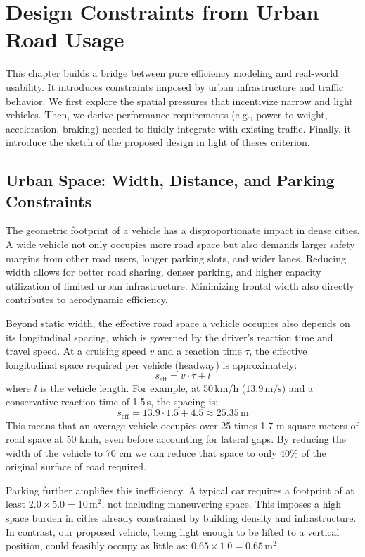 \section{Design Constraints from Urban Road Usage}

This chapter builds a bridge between pure efficiency modeling and real-world usability. It introduces constraints imposed by urban infrastructure and traffic behavior. We first explore the spatial pressures that incentivize narrow and light vehicles. Then, we derive performance requirements (e.g., power-to-weight, acceleration, braking) needed to fluidly integrate with existing traffic. Finally, it introduce the sketch of the proposed design in light of theses criterion.

\subsection{Urban Space: Width, Distance, and Parking Constraints}

The geometric footprint of a vehicle has a disproportionate impact in dense cities. A wide vehicle not only occupies more road space but also demands larger safety margins from other road users, longer parking slots, and wider lanes. Reducing width allows for better road sharing, denser parking, and higher capacity utilization of limited urban infrastructure. Minimizing frontal width also directly contributes to aerodynamic efficiency. 

Beyond static width, the effective road space a vehicle occupies also depends on its longitudinal spacing, which is governed by the driver's reaction time and travel speed. At a cruising speed \(v\) and a reaction time \(\tau\), the effective longitudinal space required per vehicle (headway) is approximately:
\[
s_{\text{eff}} = v \cdot \tau + l
\]
where \(l\) is the vehicle length. For example, at 50\,km/h (\(13.9\,\text{m/s}\)) and a conservative reaction time of 1.5\,s, the spacing is:
\[
s_{\text{eff}} = 13.9 \cdot 1.5 + 4.5 \approx 25.35\,\text{m}
\]
This means that an average vehicle occupies over 25 times 1.7 m square meters of road space at 50 kmh, even before accounting for lateral gaps. By reducing the width of the vehicle to 70 cm we can reduce that space to only 40\% of the original surface of road required.

Parking further amplifies this inefficiency. A typical car requires a footprint of at least \(2.0 \times 5.0 = 10\,\text{m}^2\), not including maneuvering space. This imposes a high space burden in cities already constrained by building density and infrastructure.\\
In contrast, our proposed vehicle, being light enough to be lifted to a vertical position, could feasibly occupy as little as: $\boxed{0.65 \times 1.0 = 0.65\,\text{m}^2}$

